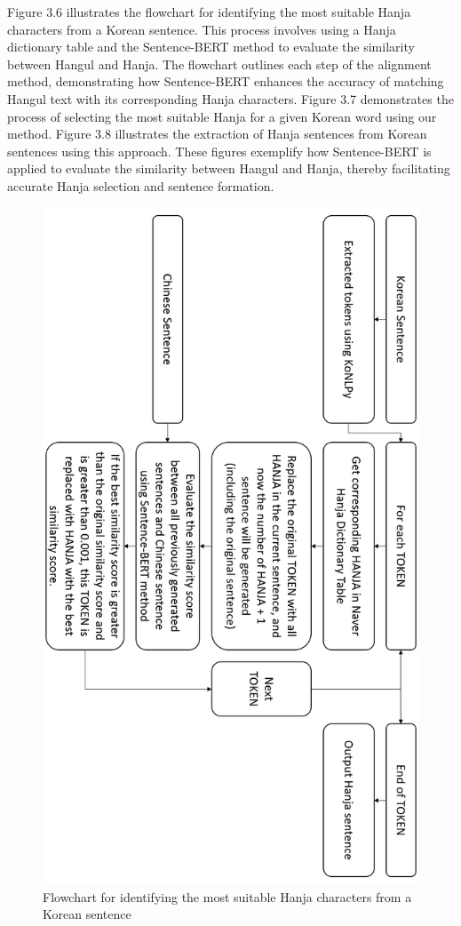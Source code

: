 \documentclass[PhD]{PHlab-thesis}
\begin{document}
Figure 3.6 illustrates the flowchart for identifying the most suitable Hanja characters from a Korean sentence. This process involves using a Hanja dictionary table and the Sentence-BERT method to evaluate the similarity between Hangul and Hanja. The flowchart outlines each step of the alignment method, demonstrating how Sentence-BERT enhances the accuracy of matching Hangul text with its corresponding Hanja characters. 
Figure 3.7 demonstrates the process of selecting the most suitable Hanja for a given Korean word using our method. 
Figure 3.8 illustrates the extraction of Hanja sentences from Korean sentences using this approach. These figures exemplify how Sentence-BERT is applied to evaluate the similarity between Hangul and Hanja, thereby facilitating accurate Hanja selection and sentence formation.

\clearpage
\begin{figure}[h!]
  \centering
  \includegraphics[width=0.75\linewidth]{fig_3_6.jpg}
  \captionsetup{type=figure}
  \caption{Flowchart for identifying the most suitable Hanja characters from a Korean sentence}
  \label{fig:flowchar_hanja}
\end{figure}
\end{document}
